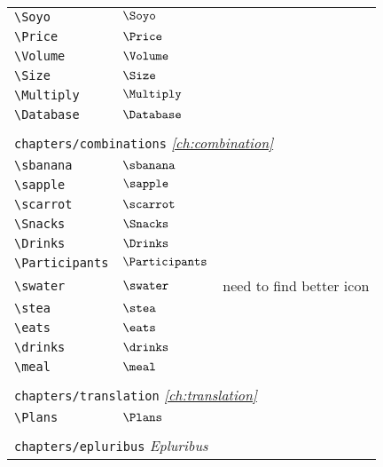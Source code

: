 \begin{longtable}{lll}
 {\color[rgb]{0.5,0.5,0.5}\texttt{\textbackslash Soyo}} & $\Soyo$ & \\ 
 {\color[rgb]{0.5,0.5,0.5}\texttt{\textbackslash Price}} & $\Price$ & \\ 
 {\color[rgb]{0.5,0.5,0.5}\texttt{\textbackslash Volume}} & $\Volume$ & \\ 
 {\color[rgb]{0.5,0.5,0.5}\texttt{\textbackslash Size}} & $\Size$ & \\ 
 {\color[rgb]{0.5,0.5,0.5}\texttt{\textbackslash Multiply}} & $\Multiply$ & \\ 
 {\color[rgb]{0.5,0.5,0.5}\texttt{\textbackslash Database}} & $\Database$ & \\ 
  &  & \\ 
 \multicolumn{3}{l}{{\color[rgb]{0.5,0.5,0.5}\texttt{chapters/combinations}} \emph{\cref{ch:combination}}}\\ 
 \hline
{\color[rgb]{0.5,0.5,0.5}\texttt{\textbackslash sbanana}} & $\sbanana$ & \\ 
 {\color[rgb]{0.5,0.5,0.5}\texttt{\textbackslash sapple}} & $\sapple$ & \\ 
 {\color[rgb]{0.5,0.5,0.5}\texttt{\textbackslash scarrot}} & $\scarrot$ & \\ 
 {\color[rgb]{0.5,0.5,0.5}\texttt{\textbackslash Snacks}} & $\Snacks$ & \\ 
 {\color[rgb]{0.5,0.5,0.5}\texttt{\textbackslash Drinks}} & $\Drinks$ & \\ 
 {\color[rgb]{0.5,0.5,0.5}\texttt{\textbackslash Participants}} & $\Participants$ & \\ 
 {\color[rgb]{0.5,0.5,0.5}\texttt{\textbackslash swater}} & $\swater$ &  need to find better icon\\ 
 {\color[rgb]{0.5,0.5,0.5}\texttt{\textbackslash stea}} & $\stea$ & \\ 
 {\color[rgb]{0.5,0.5,0.5}\texttt{\textbackslash eats}} & $\eats$ & \\ 
 {\color[rgb]{0.5,0.5,0.5}\texttt{\textbackslash drinks}} & $\drinks$ & \\ 
 {\color[rgb]{0.5,0.5,0.5}\texttt{\textbackslash meal}} & $\meal$ & \\ 
  &  & \\ 
 \multicolumn{3}{l}{{\color[rgb]{0.5,0.5,0.5}\texttt{chapters/translation}} \emph{\cref{ch:translation}}}\\ 
 \hline
{\color[rgb]{0.5,0.5,0.5}\texttt{\textbackslash Plans}} & $\Plans$ & \\ 
  &  & \\ 
 \multicolumn{3}{l}{{\color[rgb]{0.5,0.5,0.5}\texttt{chapters/epluribus}} \emph{Epluribus}}\\ 

\end{longtable}
